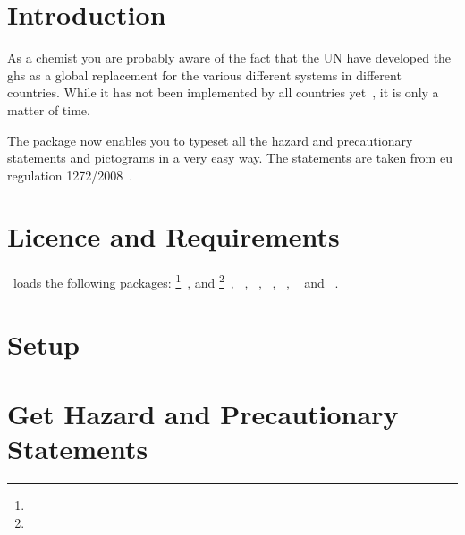 \documentclass{ghsystem-manual}
\begin{document}
\section{Introduction}
As a chemist you are probably aware of the fact that the \acl{UN} have
developed the \ac{ghs} as a global replacement for the various different
systems in different countries.  While it has not been implemented by all
countries yet~\cite{unece:ghsystem_implementation}, it is only a matter of
time.

The package \ghsystem{} now enables you to typeset all the hazard and
precautionary statements and pictograms in a very easy way.  The statements
are taken from \acs{eu} regulation 1272/2008~\cite{eu:ghsystem_regulation}.

\section{Licence and Requirements}
\license

\ghsystem\ loads the following packages:
\footnote{}~\cite{bnd:l3kernel},  and
\footnote{}~\cite{bnd:l3packages},
~\cite{pkg:translations},
~\cite{pkg:translations},
~\cite{pkg:siunitx},
~\cite{pkg:graphicx},
~\cite{pkg:longtable} and
~\cite{pkg:ifpdf}.

\section{Setup}

\section{Get Hazard and Precautionary Statements}
\end{document}
